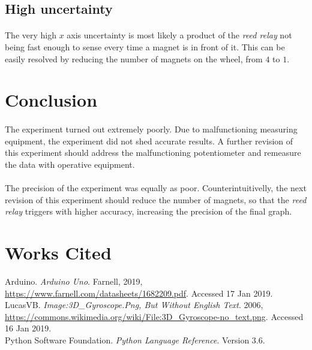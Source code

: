\documentclass[a4paper]{article}
\begin{document}
\subsection{High uncertainty}

\paragraph*{}
The very high $x$ axis uncertainty is most likely a product of the \textit{reed
relay} not being fast enough to sense every time a magnet is in front of it.
This can be easily resolved by reducing the number of magnets on the wheel,
from $4$ to $1$.

\section{Conclusion}

\paragraph*{}
The experiment turned out extremely poorly. Due to malfunctioning measuring
equipment, the experiment did not shed accurate results. A further revision of
this experiment should address the malfunctioning potentiometer and remeasure
the data with operative equipment.

\paragraph*{}
The precision of the experiment was equally as poor. Counterintuitivelly, the
next revision of this experiment should reduce the number of magnets, so that
the \textit{reed relay} triggers with higher accuracy, increasing the precision
of the final graph.

\singlespacing
\pagebreak
\clearpage
{}
\section*{Works Cited}
\begin{hangparas}{.25in}{1}
  \begin{sloppypar}
    Arduino. \textit{Arduino Uno}. Farnell, 2019,
    \url{https://www.farnell.com/datasheets/1682209.pdf}. Accessed 17 Jan 2019.
    \\

    LucasVB. \textit{Image:3D\_Gyroscope.Png, But Without English Text}. 2006,
    \url{https://commons.wikimedia.org/wiki/File:3D_Gyroscope-no_text.png}.
    Accessed 16 Jan 2019. \\

    Python Software Foundation. \textit{Python Language Reference}. Version
    3.6. \\
  \end{sloppypar}
\end{hangparas}
\end{document}

